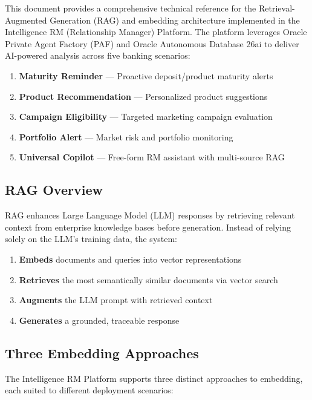 \documentclass[12pt,a4paper]{article}
\begin{document}
This document provides a comprehensive technical reference for the Retrieval-Augmented Generation (RAG) and embedding architecture implemented in the Intelligence RM (Relationship Manager) Platform. The platform leverages Oracle Private Agent Factory (PAF) and Oracle Autonomous Database 26ai to deliver AI-powered analysis across five banking scenarios:

\begin{enumerate}[label=\arabic*.]
  \item \textbf{Maturity Reminder} — Proactive deposit/product maturity alerts
  \item \textbf{Product Recommendation} — Personalized product suggestions
  \item \textbf{Campaign Eligibility} — Targeted marketing campaign evaluation
  \item \textbf{Portfolio Alert} — Market risk and portfolio monitoring
  \item \textbf{Universal Copilot} — Free-form RM assistant with multi-source RAG
\end{enumerate}

\subsection{RAG Overview}

RAG enhances Large Language Model (LLM) responses by retrieving relevant context from enterprise knowledge bases before generation. Instead of relying solely on the LLM's training data, the system:

\begin{enumerate}[label=\arabic*.]
  \item \textbf{Embeds} documents and queries into vector representations
  \item \textbf{Retrieves} the most semantically similar documents via vector search
  \item \textbf{Augments} the LLM prompt with retrieved context
  \item \textbf{Generates} a grounded, traceable response
\end{enumerate}

\subsection{Three Embedding Approaches}

The Intelligence RM Platform supports three distinct approaches to embedding, each suited to different deployment scenarios:
\end{document}
